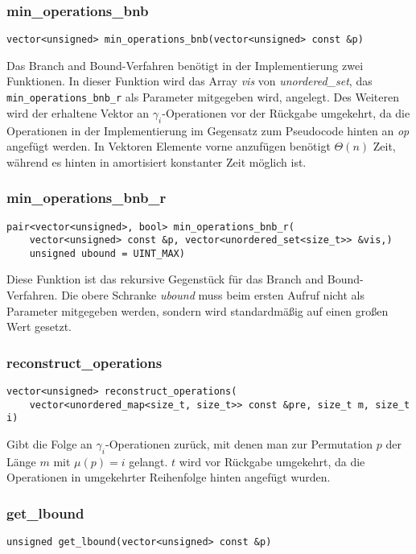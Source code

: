 \documentclass[a4paper, 10pt, ngerman]{article}
\begin{document}
\subsubsection{min\_operations\_bnb}
\verb|vector<unsigned> min_operations_bnb(vector<unsigned> const &p)|
\medskip

\noindent Das Branch and Bound-Verfahren benötigt in der Implementierung zwei Funktionen. In dieser Funktion wird das Array \emph{vis} von \emph{unordered\_set}, das \verb|min_operations_bnb_r| als Parameter mitgegeben wird, angelegt. Des Weiteren wird der erhaltene Vektor an $\gamma_i$-Operationen vor der Rückgabe umgekehrt, da die Operationen in der Implementierung im Gegensatz zum Pseudocode hinten an \emph{op} angefügt werden. In Vektoren Elemente vorne anzufügen benötigt $\Theta(n)$ Zeit, während es hinten in amortisiert konstanter Zeit möglich ist.

\subsubsection{min\_operations\_bnb\_r}
\verb|pair<vector<unsigned>, bool> min_operations_bnb_r(| \\
\verb|    vector<unsigned> const &p, vector<unordered_set<size_t>> &vis,)| \\
\verb|    unsigned ubound = UINT_MAX)|
\medskip

\noindent Diese Funktion ist das rekursive Gegenstück für das Branch and Bound-Verfahren. Die obere Schranke \emph{ubound} muss beim ersten Aufruf nicht als Parameter mitgegeben werden, sondern wird standardmäßig auf einen großen Wert gesetzt.

\subsubsection{reconstruct\_operations}
\verb|vector<unsigned> reconstruct_operations(| \\
\verb|    vector<unordered_map<size_t, size_t>> const &pre, size_t m, size_t i)|
\medskip

\noindent Gibt die Folge an $\gamma_i$-Operationen zurück, mit denen man zur Permutation $p$ der Länge $m$ mit $\mu(p) = i$ gelangt. $t$ wird vor Rückgabe umgekehrt, da die Operationen in umgekehrter Reihenfolge hinten angefügt wurden.

\subsubsection{get\_lbound}
\verb|unsigned get_lbound(vector<unsigned> const &p)|
\medskip
\end{document}
